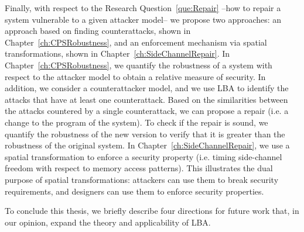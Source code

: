 Finally, with respect to the Research Question~\ref{que:Repair} --how to repair a system vulnerable to a given attacker model-- we propose two approaches: an approach based on finding counterattacks, shown in Chapter~\ref{ch:CPSRobustness}, and an enforcement mechanism via spatial transformations, shown in Chapter~\ref{ch:SideChannelRepair}. In Chapter~\ref{ch:CPSRobustness}, we quantify the robustness of a system with respect to the attacker model to obtain a relative measure of security. In addition, we consider a counterattacker model, and we use LBA to identify the attacks that have at least one counterattack. Based on the similarities between the attacks countered by a single counterattack, we can propose a repair (i.e. a change to the program of the system). To check if the repair is sound, we quantify the robustness of the new version to verify that it is greater than the robustness of the original system. In Chapter~\ref{ch:SideChannelRepair}, we use a spatial transformation to enforce a security property (i.e. timing side-channel freedom with respect to memory access patterns). This illustrates the dual purpose of spatial transformations: attackers can use them to break security requirements, and designers can use them to enforce security properties. 

To conclude this thesis, we briefly describe four directions for future work that, in our opinion, expand the theory and applicability of LBA.




      
